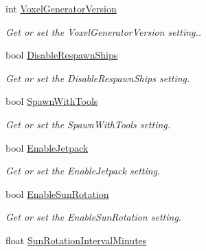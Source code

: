 \begin{DoxyCompactItemize}
int \hyperlink{class_s_e_mod_a_p_i_1_1_a_p_i_1_1_definitions_1_1_dedicated_config_definition_a1615f62022bb9b538a0cabb29f466ee2}{Voxel\+Generator\+Version}
\begin{DoxyCompactList}\small\item\em Get or set the Voxel\+Generator\+Version setting.. \end{DoxyCompactList}\item 
bool \hyperlink{class_s_e_mod_a_p_i_1_1_a_p_i_1_1_definitions_1_1_dedicated_config_definition_abbe516327ef72c465d3aed1619bdc83c}{Disable\+Respawn\+Ships}
\begin{DoxyCompactList}\small\item\em Get or set the Disable\+Respawn\+Ships setting. \end{DoxyCompactList}\item 
bool \hyperlink{class_s_e_mod_a_p_i_1_1_a_p_i_1_1_definitions_1_1_dedicated_config_definition_a38973d036b30f50c0d2b4e5e2d8a3445}{Spawn\+With\+Tools}
\begin{DoxyCompactList}\small\item\em Get or set the Spawn\+With\+Tools setting. \end{DoxyCompactList}\item 
bool \hyperlink{class_s_e_mod_a_p_i_1_1_a_p_i_1_1_definitions_1_1_dedicated_config_definition_a3f2708b289653d6b6f9b5d01d6c81a0f}{Enable\+Jetpack}
\begin{DoxyCompactList}\small\item\em Get or set the Enable\+Jetpack setting. \end{DoxyCompactList}\item 
bool \hyperlink{class_s_e_mod_a_p_i_1_1_a_p_i_1_1_definitions_1_1_dedicated_config_definition_a4510fc12c4dfab63cc8890034b0cfe58}{Enable\+Sun\+Rotation}
\begin{DoxyCompactList}\small\item\em Get or set the Enable\+Sun\+Rotation setting. \end{DoxyCompactList}\item 
float \hyperlink{class_s_e_mod_a_p_i_1_1_a_p_i_1_1_definitions_1_1_dedicated_config_definition_ae297d7dd7e6ac374bbbf0ee0817da887}{Sun\+Rotation\+Interval\+Minutes}

\end{DoxyCompactItemize}
